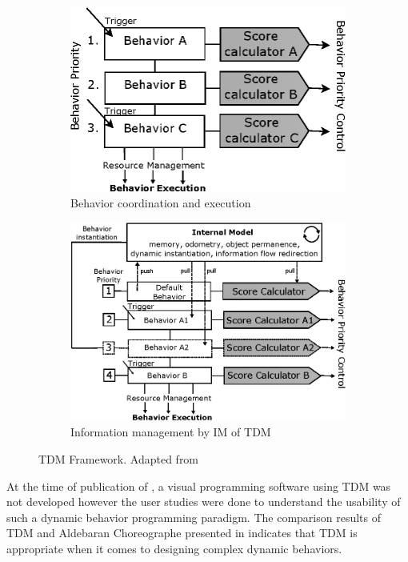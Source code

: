 {\begin{figure}[H]
\centering
\begin{subfigure}[b]{0.45\textwidth}
\includegraphics[width=\textwidth]{assets/tdm_priority.eps}
\caption{Behavior coordination and execution}
\label{fig:tdm_priority}
\end{subfigure}%
\hfill
\begin{subfigure}[b]{0.45\textwidth}
\includegraphics[width=\textwidth]{assets/tdm_im.eps}
\caption{Information management by IM of TDM}
\label{fig:tdm_im}
\end{subfigure}%
\caption[Target-drives-means Framework]{TDM Framework. {Adapted from \cite{berenz2014targets}}}
\label{fig:tdm1}
\end{figure}
At the time of publication of \cite{berenz2014targets}, a visual programming software using TDM was not developed however the user studies were done to understand the usability of such a dynamic behavior programming paradigm. The comparison results of TDM and Aldebaran Choreographe presented in \cite{berenz2014targets} indicates that TDM is appropriate when it comes to designing complex dynamic behaviors.

}
